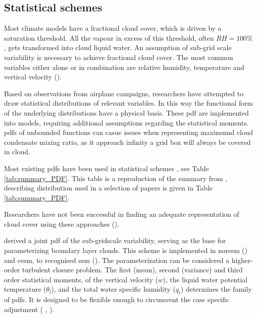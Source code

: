 \subsection{Statistical schemes}
Most climate models have a fractional cloud cover, which is driven by a saturation threshold. All the vapour in excess of this threshold, often $RH=100\%$, gets transformed into cloud liquid water. An assumption of sub-grid scale variability is necessary to achieve fractional cloud cover. %
The most common variables either alone or in combination are relative humidity, temperature and vertical velocity (\cite{Golaz2002_part1}). 

Based on observations from airplane campaigns, researchers have attempted to draw statistical distributions of relevant variables. In this way the functional form of the underlying distributions have a physical basis. These \acrfull{pdf} are implemented into models, requiring additional assumptions regarding the statistical moments. \acrshort{pdf}s of unbounded functions can casue issues when representing maximumd cloud condensate mixing ratio, as it approach infinity a grid box will always be covered in cloud. 


Most existing \acrshort{pdf}s have been used in statistical schemes
, see Table \ref{tab:summary_PDF}. This table is a reproduction of the summary from , describing distribution used in a selection of papers is given in Table \ref{tab:summary_PDF}.

Researchers have not been successful in finding an adequate representation of cloud cover using these approaches (\cite{Tompkins2009CloudParametrization}). 

 derived a joint \acrshort{pdf} of the sub-gridscale variability, serving as the base for parameterizing boundary layer clouds. This scheme is implemented in \acrfull{noresm} (\cite{SelandNORESM}) and \acrfull{cesm}, to recognised \acrshort{esm} (\cite{DanabasogluCESM}).
The parameterization can be considered a higher-order turbulent closure problem. The first (mean), second (variance) and third order statistical moments, of the vertical velocity ($w$), the liquid water potential temperature ($\theta_l$), and the total water specific humidity ($q_t$) determines the family of \acrshort{pdf}s. It is designed to be flexible enough to %
circumvent the case specific adjustment ( \cite{Golaz2002_part1},  \cite{Golaz2002_part2}). 


